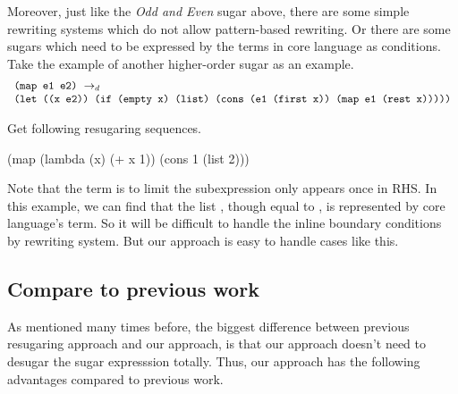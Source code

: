 Moreover, just like the \emph{Odd and Even} sugar above, there are some simple rewriting systems which do not allow pattern-based rewriting. Or there are some sugars which need to be expressed by the terms in core language as conditions. Take the example of another higher-order sugar  as an example.
\[
\begin{array}{l}
\texttt{(map e1 e2)} ~\rightarrow_d~\\
\texttt{(let ((x e2)) (if (empty x) (list) (cons (e1 (first x)) (map e1 (rest x)))))}
\end{array}
\]

Get following resugaring sequences.
\begin{Codes}
    (map (lambda (x) (+ x 1)) (cons 1 (list 2)))
\end{Codes}

Note that the  term is to limit the subexpression only appears once in RHS. In this example, we can find that the list , though equal to , is represented by core language's term. So it will be difficult to handle the inline boundary conditions by rewriting system. But our approach is easy to handle cases like this.

\subsection{Compare to previous work}

As mentioned many times before, the biggest difference between previous resugaring approach and our approach, is that our approach doesn't need to desugar the sugar expresssion totally. Thus, our approach has the following advantages compared to previous work.

